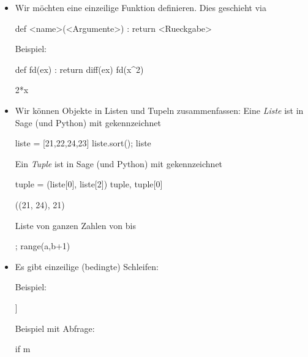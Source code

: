 \documentclass[fontsize=12pt,paper=a4,twoside,bibtotoc,idxtotoc,
liststotoc,pagesize,BCOR1.2cm,DIV15,chapterprefix,pagesize=pdftex]{scrbook}
\begin{document}
\begin{itemize}
 \item Wir möchten eine einzeilige Funktion definieren. Dies geschieht via
  \begin{sagein}
  def <name>(<Argumente>) : return <Rueckgabe>
  \end{sagein}
  Beispiel: 
  \begin{sagein}
  def fd(ex) : return diff(ex)
  fd(x^2)
  \end{sagein}
  \begin{sageout}
  2*x
  \end{sageout}
 \item Wir können Objekte in Listen und Tupeln zusammenfassen:\newline
  Eine \emph{Liste} ist in Sage (und Python) mit \isage{[..,..]} gekennzeichnet
  \begin{sagein}
  liste = [21,22,24,23]
  liste.sort(); liste 
  \end{sagein}
  \begin{sageout}
  [21, 22, 23, 24]
  \end{sageout}
  Ein \emph{Tuple} ist in Sage (und Python) mit  gekennzeichnet 
  \begin{sagein}
  tuple = (liste[0], liste[2])
  tuple, tuple[0]
  \end{sagein}
  \begin{sageout}
  ((21, 24), 21) 
  \end{sageout}
  Liste von ganzen Zahlen von  bis 
  \begin{sagein}
  [a..b] ; range(a,b+1)
  \end{sagein}
 \item Es gibt einzeilige (bedingte) Schleifen:
  \begin{sagein}
  \end{sagein}
  Beispiel:
  \begin{sagein}
  [m^2 for m in [1..5] ]
  \end{sagein}
  \begin{sageout}
  [1, 4, 9, 16, 25]
  \end{sageout}
  Beispiel mit Abfrage:
  \begin{sagein}
  [m^2 for m in [1..5] if m%
  \end{sagein}
  \begin{sageout}
  [4, 16]
  \end{sageout}
\end{itemize}
\end{document}
